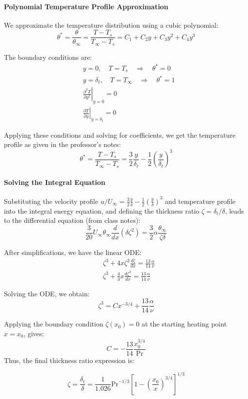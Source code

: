 \paragraph{Polynomial Temperature Profile Approximation}
We approximate the temperature distribution using a cubic polynomial:
\[
        \theta^* = \frac{\theta}{\theta_\infty} = \frac{T - T_s}{T_\infty - T_s} = C_1 + C_2 y + C_3 y^2 + C_4 y^3
\]

The boundary conditions are:
\[
    \begin{aligned}
    & y=0, \quad T=T_s \quad \Rightarrow \quad \theta^* = 0 \\
    & y=\delta_t, \quad T=T_\infty \quad \Rightarrow \quad \theta^* = 1 \\
    & \left.\frac{\partial^2 T}{\partial y^2}\right|_{y=0}=0 \\
    & \left.\frac{\partial T}{\partial y}\right|_{y=\delta_t}=0
    \end{aligned}
\]

Applying these conditions and solving for coefficients, we get the temperature profile as given in the professor’s notes:
\[
    \theta^* =  \frac{T - T_s}{T_\infty - T_s} = \frac{3}{2}\frac{y}{\delta_t} - \frac{1}{2}\left(\frac{y}{\delta_t}\right)^3
\]

\paragraph{Solving the Integral Equation}
Substituting the velocity profile \(u/U_\infty = \frac{3}{2} \frac{y}{\delta}-\frac{1}{2}\left(\frac{y}{\delta}\right)^3\) and temperature profile into the integral energy equation, and defining the thickness ratio \(\zeta = \delta_t/\delta\), leads to the differential equation (from class notes):
\[
    \frac{3}{20} U_\infty \theta_\infty\frac{d}{dx}(\delta \zeta^2) = \frac{3}{2}\alpha\frac{\theta_\infty}{\zeta \delta}
\]

After simplifications, we have the linear ODE:
\[
    \begin{aligned}
            & \zeta^3+ 4 x \zeta^2 \frac{d \zeta}{d x}=\frac{13}{14} \frac{\alpha}{\nu}
            \\[0.5em]
            &\zeta^3 + \frac{4}{3} x \frac{d \zeta^3}{dx} = \frac{13}{14}\frac{\alpha}{\nu}
    \end{aligned}
\]

Solving the ODE, we obtain:
\[
\zeta^3 = C x^{-3/4} + \frac{13}{14}\frac{\alpha}{\nu}
\]

Applying the boundary condition \(\zeta(x_0)=0\) at the starting heating point \(x=x_0\), gives:
\[
C = -\frac{13}{14}\frac{x_0^{3/4}}{\mathrm{Pr}}
\]
%
Thus, the final thickness ratio expression is:
\begin{definition}
\[
    \zeta = \frac{\delta_t}{\delta} = \frac{1}{1.026}\mathrm{Pr}^{-1/3}\left[1-\left(\frac{x_0}{x}\right)^{3/4}\right]^{1/3}
\]    
\end{definition}
%
